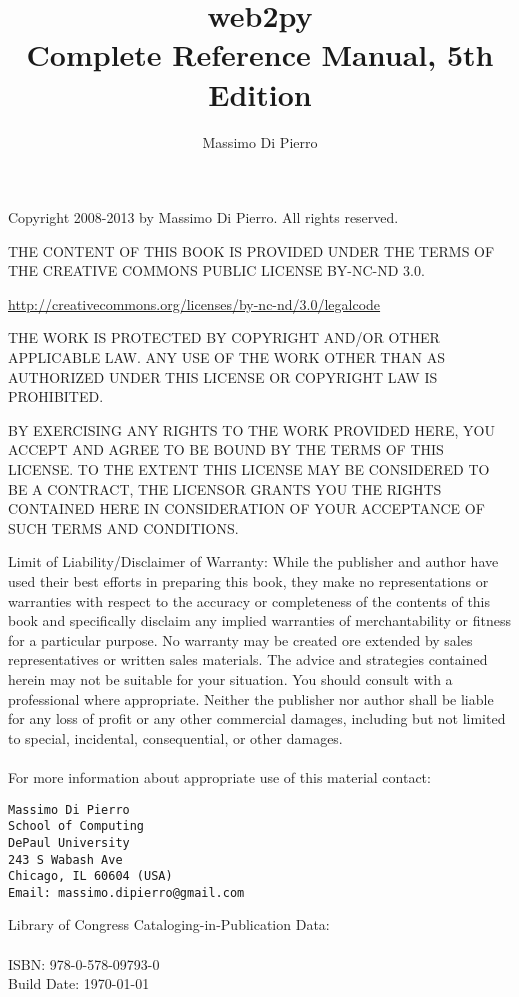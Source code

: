\documentclass[justified,sixbynine,notoc]{tufte-book}
\title{web2py\\{\small Complete Reference Manual, 5th Edition}}
\author{Massimo Di Pierro}
\begin{document}
\frontmatter

\maketitle
\thispagestyle{empty}
\setlength{\parindent}{0pt}
\setlength{\parskip}{2mm}
{\footnotesize
\vskip 1in
Copyright 2008-2013 by Massimo Di Pierro. All rights reserved.
\vskip 1cm

THE CONTENT OF THIS BOOK IS PROVIDED UNDER THE TERMS OF THE CREATIVE COMMONS PUBLIC LICENSE BY-NC-ND 3.0.

\url{http://creativecommons.org/licenses/by-nc-nd/3.0/legalcode}

THE WORK IS PROTECTED BY COPYRIGHT AND/OR OTHER APPLICABLE LAW. ANY USE OF THE WORK OTHER THAN AS AUTHORIZED UNDER THIS LICENSE OR COPYRIGHT LAW IS PROHIBITED.

BY EXERCISING ANY RIGHTS TO THE WORK PROVIDED HERE, YOU ACCEPT AND AGREE TO BE BOUND BY THE TERMS OF THIS LICENSE. TO THE EXTENT THIS LICENSE MAY BE CONSIDERED TO BE A CONTRACT, THE LICENSOR GRANTS YOU THE RIGHTS CONTAINED HERE IN CONSIDERATION OF YOUR ACCEPTANCE OF SUCH TERMS AND CONDITIONS.

Limit of Liability/Disclaimer of Warranty: While the publisher and
author have used their best efforts in preparing this book, they
make no representations or warranties with respect to the accuracy
or completeness of the contents of this book and specifically
disclaim any implied warranties of merchantability or fitness for a
particular purpose.  No warranty may be created ore extended by
sales representatives or written sales materials. 
The advice and strategies contained herein may not be
suitable for your situation. You should consult with a professional
where appropriate.  Neither the publisher nor author shall be liable 
for any loss of profit or any other commercial damages, including
but not limited to special, incidental, consequential, or other damages. \\ \\

For more information about appropriate use of this material contact:

\begin{verbatim}
Massimo Di Pierro
School of Computing
DePaul University
243 S Wabash Ave
Chicago, IL 60604 (USA)
Email: massimo.dipierro@gmail.com
\end{verbatim}

Library of Congress Cataloging-in-Publication Data: \\ \\
ISBN: 978-0-578-09793-0 \\
Build Date: \today
}
\end{document}

